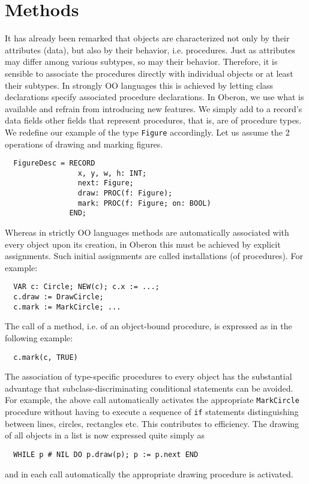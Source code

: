 \section{Methods}
It has already been remarked that objects are characterized not only by their attributes (data),
but also by their behavior, i.e. procedures. Just as attributes may differ among various subtypes,
so may their behavior. Therefore, it is sensible to associate the procedures directly with individual
objects or at least their subtypes. In strongly OO languages this is achieved by letting class
declarations specify associated procedure declarations. In Oberon, we use what is available and
refrain from introducing new features. We simply add to a record’s data fields other fields that
represent procedures, that is, are of procedure types. We redefine our example of the type
\verb|Figure| accordingly. Let us assume the 2 operations of drawing and marking figures.
\begin{verbatim}
  FigureDesc = RECORD
                 x, y, w, h: INT;
                 next: Figure;
                 draw: PROC(f: Figure);
                 mark: PROC(f: Figure; on: BOOL)
               END;
\end{verbatim}
Whereas in strictly OO languages methods are automatically associated with every object upon its
creation, in Oberon this must be achieved by explicit assignments. Such initial assignments are
called installations (of procedures). For example:
\begin{verbatim}
  VAR c: Circle; NEW(c); c.x := ...;
  c.draw := DrawCircle;
  c.mark := MarkCircle; ...
\end{verbatim}
The call of a method, i.e. of an object-bound procedure, is expressed as in the following example:
\begin{verbatim}
  c.mark(c, TRUE)
\end{verbatim}
The association of type-specific procedures to every object has the substantial advantage that
subclass-discriminating conditional statements can be avoided. For example, the above call
automatically activates the appropriate \verb|MarkCircle| procedure without having to execute a
sequence of \verb|if| statements distinguishing between lines, circles, rectangles etc. This
contributes to efficiency. The drawing of all objects in a list is now expressed quite simply as
\begin{verbatim}
  WHILE p # NIL DO p.draw(p); p := p.next END
\end{verbatim}
and in each call automatically the appropriate drawing procedure is activated.

